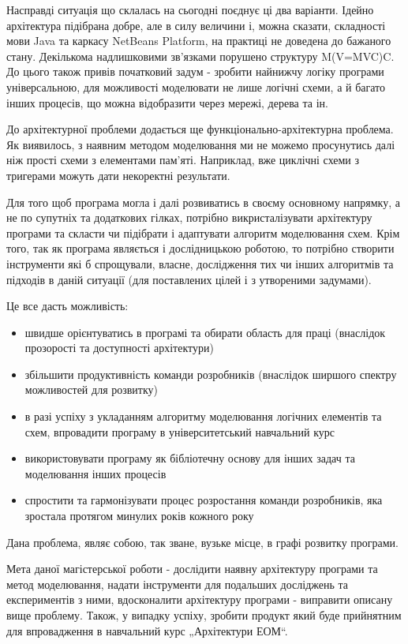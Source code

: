 \documentclass[12pt,a4paper]{article}
\begin{document}
Насправді ситуація що склалась на сьогодні поєднує ці два варіанти. Ідейно архітектура підібрана добре, але в силу величини і, можна сказати, складності мови Java та каркасу NetBeans Platform, на практиці не доведена до бажаного стану. Декількома надлишковими зв’язками порушено структуру M(V=MVC)C. До цього також привів початковий задум - зробити найнижчу логіку програми універсальною, для можливості моделювати не лише логічні схеми, а й багато інших процесів, що можна відобразити через мережі, дерева та ін.

До архітектурної проблеми додається ще функціонально-архітектурна проблема. Як виявилось, з наявним методом моделювання ми не можемо просунутись далі ніж прості схеми з елементами пам’яті. Наприклад, вже циклічні схеми з тригерами можуть дати некоректні результати.

Для того щоб програма могла і далі розвиватись в своєму основному напрямку, а не по супутніх та додаткових гілках, потрібно викристалізувати архітектуру програми та скласти чи підібрати і адаптувати алгоритм моделювання схем. Крім того, так як програма являється і дослідницькою роботою, то потрібно створити інструменти які б спрощували, власне, дослідження тих чи інших алгоритмів та підходів в даній ситуації (для поставлених цілей і з утвореними задумами).

Це все дасть можливість:
\begin{itemize}
  \item швидше орієнтуватись в програмі та обирати область для праці (внаслідок прозорості та доступності архітектури)
  \item збільшити продуктивність команди розробників (внаслідок ширшого спектру можливостей для розвитку)
  \item в разі успіху з укладанням алгоритму моделювання логічних елементів та схем, впровадити програму в університетський навчальний курс
  \item використовувати програму як бібліотечну основу для інших задач та моделювання інших процесів
  \item спростити та гармонізувати процес розростання команди розробників, яка зростала протягом минулих років кожного року
\end{itemize}

Дана проблема, являє собою, так зване, вузьке місце, в графі розвитку програми.

Мета даної магістерської роботи - дослідити наявну архітектуру програми та метод моделювання, надати інструменти для подальших досліджень та експериментів з ними, вдосконалити архітектуру програми - виправити описану вище проблему. Також, у випадку успіху, зробити продукт який буде прийнятним для впровадження в навчальний курс „Архітектури ЕОМ“.
\end{document}
